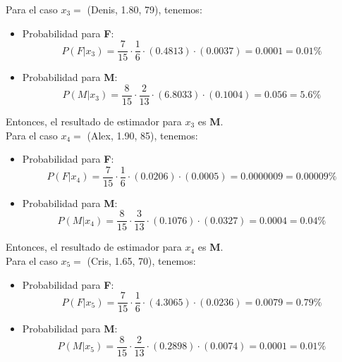 \documentclass[letterpaper,12pt]{article}
\theoremstyle{definition}
\begin{document}
Para el caso \(x_3 = \) (Denis, 1.80, 79), tenemos:\\
\begin{itemize}
  \item Probabilidad para \textbf{F}:
  \begin{equation}
    P(F|x_3) = \frac{7}{15}  \cdot \frac{1}{6} \cdot (0.4813) \cdot (0.0037) = 0.0001 = 0.01\%
  \end{equation}
  \item Probabilidad para \textbf{M}: 
  \begin{equation}
    P(M|x_3) = \frac{8}{15}  \cdot \frac{2}{13} \cdot (6.8033) \cdot (0.1004) = 0.056 = 5.6\%
  \end{equation}
\end{itemize}
\medskip

Entonces, el resultado de estimador para \(x_3\) es \textbf{M}.\\

Para el caso \(x_4 = \) (Alex, 1.90, 85), tenemos:\\
\begin{itemize}
  \item Probabilidad para \textbf{F}:
  \begin{equation}
    P(F|x_4) = \frac{7}{15}  \cdot \frac{1}{6} \cdot (0.0206) \cdot (0.0005) = 0.0000009 = 0.00009\%
  \end{equation}
  \item Probabilidad para \textbf{M}: 
  \begin{equation}
    P(M|x_4) = \frac{8}{15}  \cdot \frac{3}{13} \cdot (0.1076) \cdot (0.0327) = 0.0004 = 0.04\%
  \end{equation}
\end{itemize}
\medskip

Entonces, el resultado de estimador para \(x_4\) es \textbf{M}.\\

Para el caso \(x_5 = \) (Cris, 1.65, 70), tenemos:\\
\begin{itemize}
  \item Probabilidad para \textbf{F}:
  \begin{equation}
    P(F|x_5) = \frac{7}{15}  \cdot \frac{1}{6} \cdot (4.3065) \cdot (0.0236) = 0.0079 = 0.79\%
  \end{equation}
  \item Probabilidad para \textbf{M}: 
  \begin{equation}
    P(M|x_5) = \frac{8}{15}  \cdot \frac{2}{13} \cdot (0.2898) \cdot (0.0074) = 0.0001 = 0.01\%
  \end{equation}
\end{itemize}
\medskip
\end{document}
